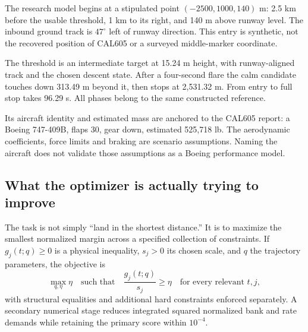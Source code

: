 \label{part:4}
The research model begins at a stipulated point $(-2500,1000,140)$ m: 2.5 km before the usable threshold, 1 km to its right, and 140 m above runway level. The inbound ground track is $47^\circ$ left of runway direction. This entry is synthetic, not the recovered position of CAL605 or a surveyed middle-marker coordinate.


The threshold is an intermediate target at 15.24 m height, with runway-aligned track and the chosen descent state. After a four-second flare the calm candidate touches down 313.49 m beyond it, then stops at 2,531.32 m. From entry to full stop takes 96.29 s. All phases belong to the same constructed reference.

Its aircraft identity and estimated mass are anchored to the CAL605 report: a Boeing 747-409B, flaps 30, gear down, estimated 525,718 lb. The aerodynamic coefficients, force limits and braking are scenario assumptions. Naming the aircraft does not validate those assumptions as a Boeing performance model.
\clearpage
\subsection*{What the optimizer is actually trying to improve}
The task is not simply ``land in the shortest distance.'' It is to maximize the smallest normalized margin across a specified collection of constraints. If $g_j(t;q)\geq0$ is a physical inequality, $s_j>0$ its chosen scale, and $q$ the trajectory parameters, the objective is
\begin{equation}
\max_{q,\eta}\eta\quad\text{such that}\quad
\frac{g_j(t;q)}{s_j}\geq\eta\quad\text{for every relevant }t,j,
\label{eq:objective}
\end{equation}
with structural equalities and additional hard constraints enforced separately. A secondary numerical stage reduces integrated squared normalized bank and rate demands while retaining the primary score within $10^{-4}$.

